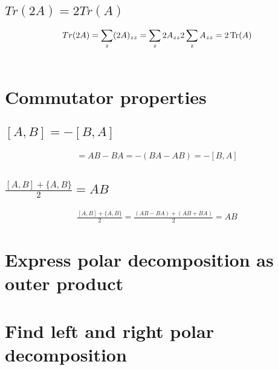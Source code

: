 \documentclass[11pt]{book}
\begin{document}
\subsection{$Tr(2A) = 2Tr(A)$}
\begin{align*}
    Tr(2A) = \sum_z (2A)_{zz} = \sum_z 2 A_{zz} 2 \sum_z A_{zz} = 2 \Tr(A)
\end{align*}

\begin{align*}
\end{align*}

\section{Commutator properties}
\subsection{$[A, B] = -[B, A]$}
\begin{align*}
    [A, B] = AB - BA = - (BA - AB) = - [B, A]
\end{align*}

\subsection{$\frac{[A, B] + \{A, B\}}{2} = AB$}
\begin{align*}
    \frac{[A, B] + \{A, B\}}{2} = \frac{(AB - BA) + (AB + BA)}{2} = AB
\end{align*}

\section{Express polar decomposition as outer product}
\section{Find left and right polar decomposition}
\end{document}
